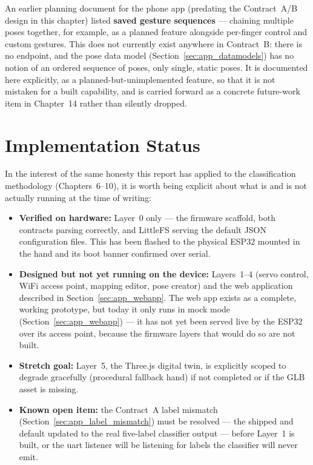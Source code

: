An earlier planning document for the phone app (predating the
Contract~A/B design in this chapter) listed \textbf{saved gesture
sequences} --- chaining multiple poses together, for example, as a
planned feature alongside per-finger control and custom gestures.
This does not currently exist anywhere in Contract~B: there is no
 endpoint, and the pose data model
(Section~\ref{sec:app_datamodels}) has no notion of an ordered
sequence of poses, only single, static poses. It is documented here
explicitly, as a planned-but-unimplemented feature, so that it is
not mistaken for a built capability, and is carried forward as a
concrete future-work item in Chapter~14 rather than silently
dropped.

\section{Implementation Status}
\label{sec:app_status}

In the interest of the same honesty this report has applied to the
classification methodology (Chapters~6--10), it is worth being
explicit about what is and is not actually running at the time of
writing:

\begin{itemize}[leftmargin=*]
    \item \textbf{Verified on hardware:} Layer~0 only --- the
    firmware scaffold, both contracts parsing correctly, and
    LittleFS serving the default JSON configuration files. This has
    been flashed to the physical ESP32 mounted in the hand and its
    boot banner confirmed over serial.
    \item \textbf{Designed but not yet running on the device:}
    Layers~1--4 (servo control, WiFi access point, mapping editor,
    pose creator) and the web application described in
    Section~\ref{sec:app_webapp}. The web app exists as a complete,
    working prototype, but today it only runs in mock mode
    (Section~\ref{sec:app_webapp}) --- it has not yet been served
    live by the ESP32 over its access point, because the firmware
    layers that would do so are not built.
    \item \textbf{Stretch goal:} Layer~5, the Three.js digital
    twin, is explicitly scoped to degrade gracefully (procedural
    fallback hand) if not completed or if the GLB asset is missing.
    \item \textbf{Known open item:} the Contract~A label mismatch
    (Section~\ref{sec:app_label_mismatch}) must be resolved --- the
    shipped  and default 
    updated to the real five-label classifier output --- before
    Layer~1 is built, or the \acrshort{uart} listener will be
    listening for labels the classifier will never emit.
\end{itemize}

